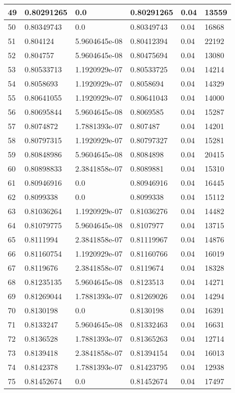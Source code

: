 \begin{longtable}{|l|l|l|l|l|l|}
49 & 0.80291265 & 0.0 & 0.80291265 & 0.04 & 13559 \\ \hline 
50 & 0.80349743 & 0.0 & 0.80349743 & 0.04 & 16868 \\ \hline 
51 & 0.804124 & 5.9604645e-08 & 0.80412394 & 0.04 & 22192 \\ \hline 
52 & 0.804757 & 5.9604645e-08 & 0.80475694 & 0.04 & 13080 \\ \hline 
53 & 0.80533713 & 1.1920929e-07 & 0.80533725 & 0.04 & 14214 \\ \hline 
54 & 0.8058693 & 1.1920929e-07 & 0.8058694 & 0.04 & 14329 \\ \hline 
55 & 0.80641055 & 1.1920929e-07 & 0.80641043 & 0.04 & 14000 \\ \hline 
56 & 0.80695844 & 5.9604645e-08 & 0.8069585 & 0.04 & 15287 \\ \hline 
57 & 0.8074872 & 1.7881393e-07 & 0.807487 & 0.04 & 14201 \\ \hline 
58 & 0.80797315 & 1.1920929e-07 & 0.80797327 & 0.04 & 15281 \\ \hline 
59 & 0.80848986 & 5.9604645e-08 & 0.8084898 & 0.04 & 20415 \\ \hline 
60 & 0.80898833 & 2.3841858e-07 & 0.8089881 & 0.04 & 15310 \\ \hline 
61 & 0.80946916 & 0.0 & 0.80946916 & 0.04 & 16445 \\ \hline 
62 & 0.8099338 & 0.0 & 0.8099338 & 0.04 & 15112 \\ \hline 
63 & 0.81036264 & 1.1920929e-07 & 0.81036276 & 0.04 & 14482 \\ \hline 
64 & 0.81079775 & 5.9604645e-08 & 0.8107977 & 0.04 & 13715 \\ \hline 
65 & 0.8111994 & 2.3841858e-07 & 0.81119967 & 0.04 & 14876 \\ \hline 
66 & 0.81160754 & 1.1920929e-07 & 0.81160766 & 0.04 & 16019 \\ \hline 
67 & 0.8119676 & 2.3841858e-07 & 0.8119674 & 0.04 & 18328 \\ \hline 
68 & 0.81235135 & 5.9604645e-08 & 0.8123513 & 0.04 & 14271 \\ \hline 
69 & 0.81269044 & 1.7881393e-07 & 0.81269026 & 0.04 & 14294 \\ \hline 
70 & 0.8130198 & 0.0 & 0.8130198 & 0.04 & 16391 \\ \hline 
71 & 0.8133247 & 5.9604645e-08 & 0.81332463 & 0.04 & 16631 \\ \hline 
72 & 0.8136528 & 1.7881393e-07 & 0.81365263 & 0.04 & 12714 \\ \hline 
73 & 0.8139418 & 2.3841858e-07 & 0.81394154 & 0.04 & 16013 \\ \hline 
74 & 0.8142378 & 1.7881393e-07 & 0.81423795 & 0.04 & 12938 \\ \hline 
75 & 0.81452674 & 0.0 & 0.81452674 & 0.04 & 17497 \\ \hline 
\end{longtable}